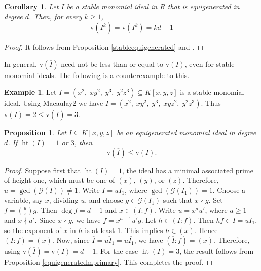 \documentclass[11pt,reqno,a4paper]{amsart}
\newtheorem{corollary}[theorem]{Corollary}
\newtheorem{proposition}[theorem]{Proposition}
\theoremstyle{definition}
\newtheorem{example}[theorem]{Example}
\begin{document}
\begin{corollary}
Let \(I\) be a stable monomial ideal in \( R\) that is equigenerated in degree \(d\). Then, for every \(k \ge 1\),
\[
\mathrm{v}(\overline{I^k}) = \mathrm{v}(I^k) = kd - 1
\]
\end{corollary}




\begin{proof}
    

It follows from Proposition  \ref{stableequigenerated} and \cite[Proposition 4.10. and 4.16.]{MandalPhukan26}.


\end{proof}

\noindent In general, $\mathrm{v}(\overline I)$ need not be less than or equal to $\mathrm{v}(I)$, even for stable monomial ideals. The following is a counterexample to this.

\begin{example}
Let 
\(
I=(x^2,\;xy^2,\;y^3,\;y^2z^3)\subseteq K[x,y,z]
\) is a stable monomial ideal. Using Macaulay2 \cite{GraysonStillman} we have 
\(
\overline I=(x^2,\;xy^2,\;y^3,\;xyz^2,\;y^2z^3).
\)
Thus 
\(
\mathrm{v}(I)=2\le \mathrm{v}(\overline I)=3.
\)
\end{example}


\begin{proposition}\label{equigeneratedht(1)orht(2)}
Let \(I \subseteq K[x,y,z]\) be an equigenerated monomial ideal in degree \(d\). If \(\operatorname{ht}(I) = 1\) or \(3\), then
\[
\mathrm{v}(\overline{I}) \le \mathrm{v}(I).
\]
\end{proposition}

\begin{proof}
Suppose first that \(\operatorname{ht}(I) = 1\), the ideal has a minimal associated prime of height one, which must be one of \((x)\), \((y)\), or \((z)\). Therefore, \(u = \gcd(\mathcal{G}(I)) \neq 1\). Write \(I = u I_1\), where \(\gcd(\mathcal{G}(I_1)) = 1\). Choose a variable, say \(x\), dividing \(u\), and choose \(g \in \mathcal{G}(I_1)\) such that \(x \nmid g\). Set
\(
f = (\frac{u}{x}) g.
\)
Then \(\deg f = d - 1\) and \(x \in (I : f)\). Write \(u = x^a u'\), where \(a \ge 1\) and \(x \nmid u'\). Since \(x \nmid g\), we have
\(
f = x^{a-1} u' g.
\)
Let \(h \in (I : f)\). Then \(h f \in I = u I_1\), so the exponent of \(x\) in \(h \) is at least \(1\). This implies \(h \in (x)\). Hence \((I : f) = (x)\). Now, since \(\overline{I} = \overline{u I_1} = u \overline{I_1}\), we have
\(
(\overline{I} : f) = (x).
\)
Therefore, using \cite[Lemma 3.1]{BiswasMandalSaha26}  \(\mathrm{v}(\overline{I}) =\mathrm{v}(I) = d - 1 \). For the case \(\operatorname{ht}(I) = 3\), the result follows from Proposition \ref{equigeneratedmprimary}. This completes the proof.
\end{proof}
\end{document}
